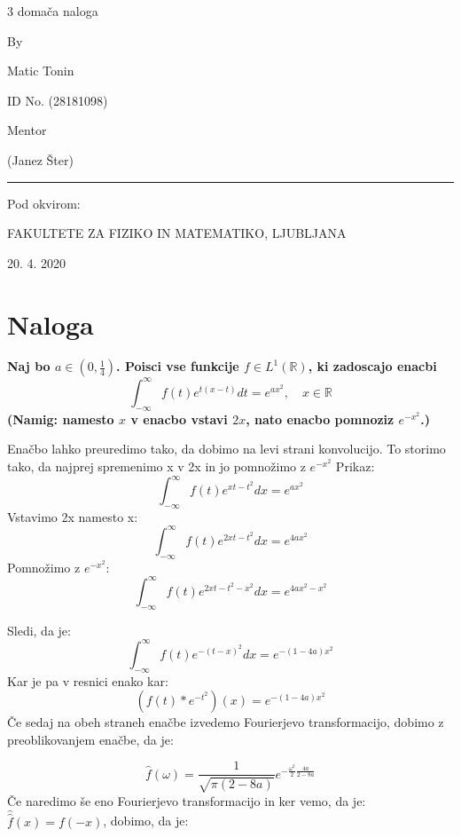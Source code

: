 \documentclass[11pt, a4paper]{article}
\theoremstyle{definition}
\theoremstyle{example}
\theoremstyle{izrek}
\begin{document}
\begin{center}
\thispagestyle{empty}
\parskip=14pt%
\vspace*{3\parskip}%
\begin{Huge} 3 domača naloga \end{Huge}

By

Matic Tonin

ID No. (28181098)

Mentor 

(Janez Šter)

\rule{7cm}{0.4pt}

Pod okvirom:

FAKULTETE ZA FIZIKO IN MATEMATIKO, LJUBLJANA

20. 4. 2020

\end{center}
\pagebreak
\section{Naloga}
\textbf{Naj bo $a \in\left(0, \frac{1}{4}\right)$. Poisci vse funkcije $f \in L^{1}(\mathbb{R})$, ki zadoscajo enacbi
\[
\int_{-\infty}^{\infty} f(t) e^{t(x-t)} d t=e^{a x^{2}}, \quad x \in \mathbb{R}
\]
(Namig: namesto $x$ v enacbo vstavi $2 x$, nato enacbo pomnoziz $e^{-x^{2}}$.)}

Enačbo lahko preuredimo tako, da dobimo na levi strani konvolucijo. To storimo tako, da najprej spremenimo x v 2x in jo pomnožimo z $e^{-x^2}$
Prikaz:
$$\int_{-\infty}^{\infty} f(t)e^{xt-t^2}dx = e^{ax^2}$$
Vstavimo 2x namesto x:
$$\int_{-\infty}^{\infty} f(t)e^{2xt-t^2}dx = e^{4ax^2}$$
Pomnožimo z $e^{-x^2}$:
$$\int_{-\infty}^{\infty} f(t)e^{2xt-t^2-x^2}dx = e^{4ax^2-x^2}$$

Sledi, da je:
\begin{equation}
\label{eq:Eq31}
\int_{-\infty}^{\infty} f(t)e^{-(t-x)^2}dx = e^{-(1-4a)x^2}
\end{equation}
Kar je pa v resnici enako kar:
\begin{equation}
\label{eq:Eq32}
\left(f(t)* e^{-t^2}\right)(x)=e^{-(1-4a)x^2}
\end{equation}
Če sedaj na obeh straneh enačbe izvedemo Fourierjevo transformacijo, dobimo z preoblikovanjem enačbe, da je:

\begin{equation}
\label{eq:Eq33}
\hat{f}(\omega)=\frac{1}{\sqrt{\pi(2-8a)}}e^{-\frac{\omega^2}{2}\frac{4a}{2-8a}}
\end{equation}
Če naredimo še eno Fourierjevo transformacijo in ker vemo, da je: $\hat{\hat{f}}(x)=f(-x)$, dobimo, da je:
\end{document}
